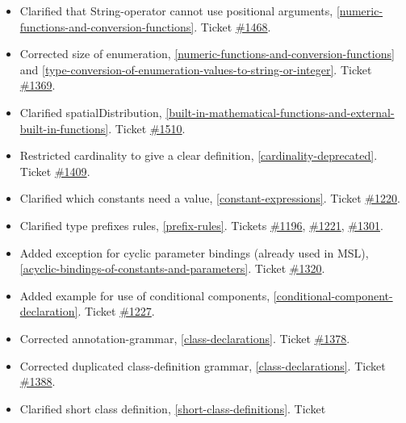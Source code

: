 \begin{itemize}
\item
  Clarified that String-operator cannot use positional arguments,
  \autoref{numeric-functions-and-conversion-functions}. Ticket
  \href{https://github.com/modelica/ModelicaSpecification/issues/1468}{\#1468}.
\item
  Corrected size of enumeration, \autoref{numeric-functions-and-conversion-functions} and \autoref{type-conversion-of-enumeration-values-to-string-or-integer}. Ticket
  \href{https://github.com/modelica/ModelicaSpecification/issues/1369}{\#1369}.
\item
  Clarified spatialDistribution, \autoref{built-in-mathematical-functions-and-external-built-in-functions}. Ticket
  \href{https://github.com/modelica/ModelicaSpecification/issues/1510}{\#1510}.
\item
  Restricted cardinality to give a clear definition, \autoref{cardinality-deprecated}.
  Ticket \href{https://github.com/modelica/ModelicaSpecification/issues/1409}{\#1409}.
\item
  Clarified which constants need a value, \autoref{constant-expressions}. Ticket
  \href{https://github.com/modelica/ModelicaSpecification/issues/1220}{\#1220}.
\item
  Clarified type prefixes rules, \autoref{prefix-rules}. Tickets
  \href{https://github.com/modelica/ModelicaSpecification/issues/1196}{\#1196},
  \href{https://github.com/modelica/ModelicaSpecification/issues/1221}{\#1221},
  \href{https://github.com/modelica/ModelicaSpecification/issues/1301}{\#1301}.
\item
  Added exception for cyclic parameter bindings (already used in MSL),
  \autoref{acyclic-bindings-of-constants-and-parameters}. Ticket
  \href{https://github.com/modelica/ModelicaSpecification/issues/1320}{\#1320}.
\item
  Added example for use of conditional components, \autoref{conditional-component-declaration}. Ticket
  \href{https://github.com/modelica/ModelicaSpecification/issues/1227}{\#1227}.
\item
  Corrected annotation-grammar, \autoref{class-declarations}. Ticket
  \href{https://github.com/modelica/ModelicaSpecification/issues/1378}{\#1378}.
\item
  Corrected duplicated class-definition grammar, \autoref{class-declarations}. Ticket
  \href{https://github.com/modelica/ModelicaSpecification/issues/1388}{\#1388}.
\item
  Clarified short class definition, \autoref{short-class-definitions}. Ticket

\end{itemize}
